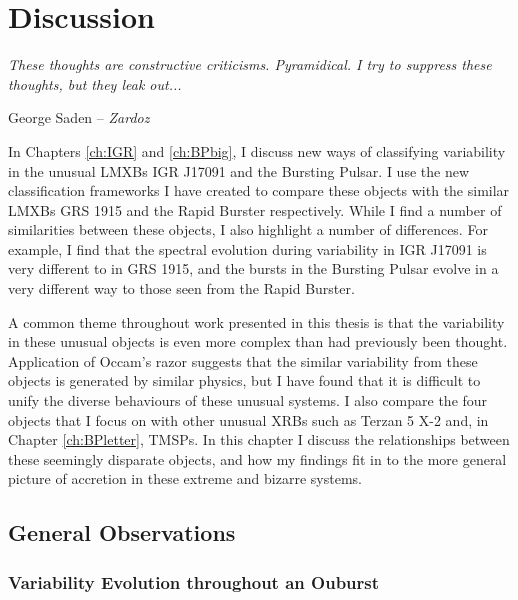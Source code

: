 \chapter{Discussion}

\epigraph{\textit{These thoughts are constructive criticisms. Pyramidical. I try to suppress these thoughts, but they leak out...}}{George Saden -- \textit{Zardoz}}

\vspace{1cm}

\par\noindent In Chapters \ref{ch:IGR} and \ref{ch:BPbig}, I discuss new ways of classifying variability in the unusual LMXBs IGR J17091 and the Bursting Pulsar.  I use the new classification frameworks I have created to compare these objects with the similar LMXBs GRS 1915 and the Rapid Burster respectively.  While I find a number of similarities between these objects, I also highlight a number of differences.  For example, I find that the spectral evolution during variability in IGR J17091 is very different to in GRS 1915, and the bursts in the Bursting Pulsar evolve in a very different way to those seen from the Rapid Burster.
\par A common theme throughout work presented in this thesis is that the variability in these unusual objects is even more complex than had previously been thought.  Application of Occam's razor \citep{Occam} suggests that the similar variability from these objects is generated by similar physics, but I have found that it is difficult to unify the diverse behaviours of these unusual systems.  I also compare the four objects that I focus on with other unusual XRBs such as Terzan 5 X-2 and, in Chapter \ref{ch:BPletter}, TMSPs.  In this chapter I discuss the relationships between these seemingly disparate objects, and how my findings fit in to the more general picture of accretion in these extreme and bizarre systems.

\section{General Observations}

\label{sec:disccomp}

\subsection{Variability Evolution throughout an Ouburst}

